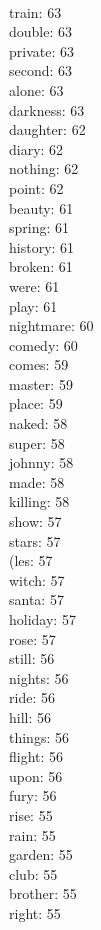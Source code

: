 \begin{multicols}{6}
  \\ train: 63
  \\ double: 63
  \\ private: 63
  \\ second: 63
  \\ alone: 63
  \\ darkness: 63
  \\ daughter: 62
  \\ diary: 62
  \\ nothing: 62
  \\ point: 62
  \\ beauty: 61
  \\ spring: 61
  \\ history: 61
  \\ broken: 61
  \\ were: 61
  \\ play: 61
  \\ nightmare: 60
  \\ comedy: 60
  \\ comes: 59
  \\ master: 59
  \\ place: 59
  \\ naked: 58
  \\ super: 58
  \\ johnny: 58
  \\ made: 58
  \\ killing: 58
  \\ show: 57
  \\ stars: 57
  \\ (les: 57
  \\ witch: 57
  \\ santa: 57
  \\ holiday: 57
  \\ rose: 57
  \\ still: 56
  \\ nights: 56
  \\ ride: 56
  \\ hill: 56
  \\ things: 56
  \\ flight: 56
  \\ upon: 56
  \\ fury: 56
  \\ rise: 55
  \\ rain: 55
  \\ garden: 55
  \\ club: 55
  \\ brother: 55
  \\ right: 55

\end{multicols}
